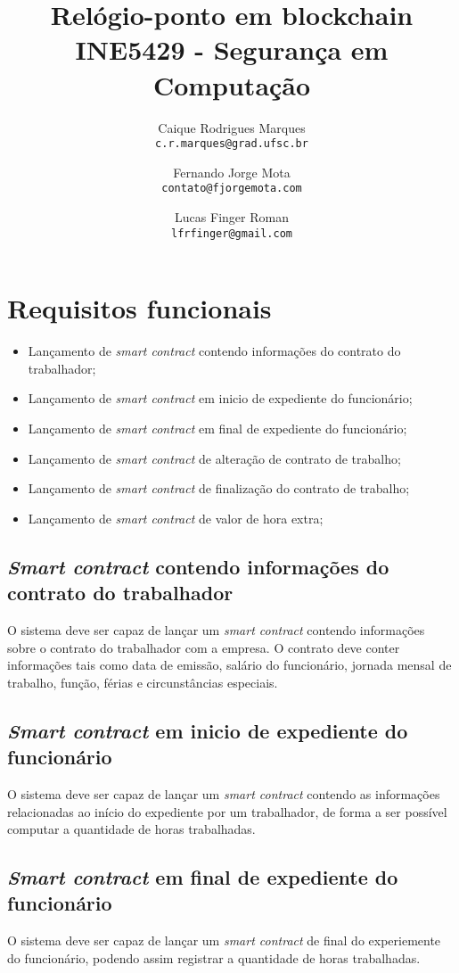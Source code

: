 \documentclass{article}
\title{\textbf{Relógio-ponto em blockchain \\
        \large INE5429 - Segurança em Computação}}
\author{
    Caique Rodrigues Marques \\
    {\texttt{c.r.marques@grad.ufsc.br}}
    \and
    Fernando Jorge Mota \\
    {\texttt{contato@fjorgemota.com}}
    \and
    Lucas Finger Roman \\
    {\texttt{lfrfinger@gmail.com}}
}
\date{}
\begin{document}
\maketitle
\section{Requisitos funcionais}
\begin{itemize}
    \item Lançamento de \textit{smart contract} contendo informações do contrato do
      trabalhador;
    \item Lançamento de \textit{smart contract} em inicio de expediente do funcionário;
    \item Lançamento de \textit{smart contract} em final de expediente do funcionário;
    \item Lançamento de \textit{smart contract} de alteração de contrato de trabalho;
    \item Lançamento de \textit{smart contract} de finalização do contrato de trabalho;
    \item Lançamento de \textit{smart contract} de valor de hora extra;
\end{itemize}

\subsection{\textit{Smart contract} contendo informações do contrato do trabalhador}
O sistema deve ser capaz de lançar um \textit{smart contract} contendo
informações sobre o contrato do trabalhador com a empresa. O contrato deve
conter informações tais como data de emissão, salário do funcionário, jornada
mensal de trabalho, função, férias e
circunstâncias especiais.

\subsection{\textit{Smart contract} em inicio de expediente do funcionário}
O sistema deve ser capaz de lançar um \textit{smart contract} contendo as
informações relacionadas ao início do expediente por um trabalhador, de forma a
ser possível computar a quantidade de horas trabalhadas.

\subsection{\textit{Smart contract} em final de expediente do funcionário}
O sistema deve ser capaz de lançar um \textit{smart contract} de final do
experiemente do funcionário, podendo assim registrar a quantidade de horas trabalhadas.
\end{document}
